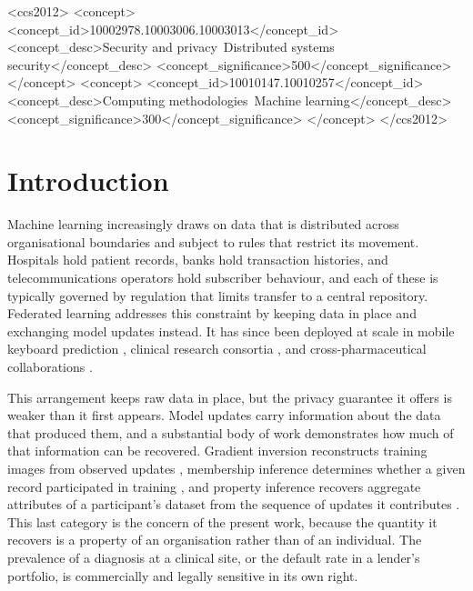 \documentclass[acmsmall,screen,review,anonymous]{acmart}
\theoremstyle{acmdefinition}%
\begin{document}
\begin{CCSXML}
<ccs2012>
   <concept>
       <concept_id>10002978.10003006.10003013</concept_id>
       <concept_desc>Security and privacy~Distributed systems security</concept_desc>
       <concept_significance>500</concept_significance>
       </concept>
   <concept>
       <concept_id>10010147.10010257</concept_id>
       <concept_desc>Computing methodologies~Machine learning</concept_desc>
       <concept_significance>300</concept_significance>
       </concept>
 </ccs2012>
\end{CCSXML}



\maketitle

\section{Introduction}
\label{sec:intro}

Machine learning increasingly draws on data that is distributed across
organisational boundaries and subject to rules that restrict its movement. Hospitals
hold patient records, banks hold transaction histories, and telecommunications
operators hold subscriber behaviour, and each of these is typically governed by
regulation that limits transfer to a central repository. Federated learning
\cite{mcmahan2017fedavg} addresses this constraint by keeping data in place and
exchanging model updates instead. It has since been deployed at scale in mobile
keyboard prediction \cite{hard2018keyboard}, clinical research consortia
\cite{sheller2020federated,dayan2021federated}, and cross-pharmaceutical
collaborations \cite{heyndrickx2023melloddy}.

This arrangement keeps raw data in place, but the privacy guarantee it offers is
weaker than it first appears. Model updates carry information about the data that
produced them, and a substantial body of work demonstrates how much of that
information can be recovered. Gradient inversion reconstructs training images from
observed updates \cite{zhu2019dlg,geiping2020inverting}, membership inference
determines whether a given record participated in training
\cite{shokri2017membership}, and property inference recovers aggregate attributes
of a participant's dataset from the sequence of updates it contributes
\cite{melis2019exploiting}. This last category is the concern of the present work,
because the quantity it recovers is a property of an organisation rather than of an
individual. The prevalence of a diagnosis at a clinical site, or the default rate
in a lender's portfolio, is commercially and legally sensitive in its own right.
\end{document}
